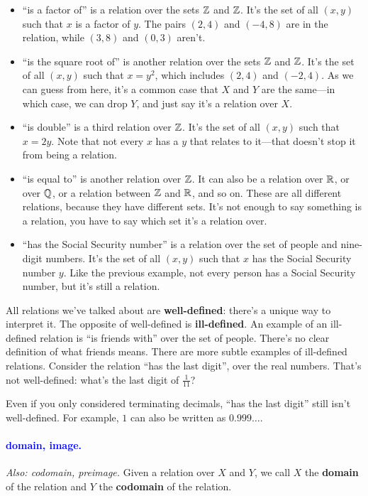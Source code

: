 \documentclass[11pt,paper=letter]{scrartcl}
\renewcommand{\bluebf}[1]{{\bfseries \color{Blue} #1}}
\renewcommand\wp[1]{\paragraph{\textcolor{Blue}{#1.}} \hspace{-1em}}
\newcommand\wl[1]{\label{w:#1}}
\newcommand\oww[1]{\textit{Also: #1.}}
\begin{document}
\begin{itemize}
  \item ``is a factor of'' is a relation over the sets $\mathbb Z$ and $\mathbb Z$. It's the set of all $(x, y)$ such that $x$ is a factor of $y$. The pairs $(2, 4)$ and $(-4, 8)$ are in the relation, while $(3, 8)$ and $(0, 3)$ aren't.
  \item ``is the square root of'' is another relation over the sets $\mathbb Z$ and $\mathbb Z$. It's the set of all $(x, y)$ such that $x = y^2$, which includes $(2, 4)$ and $(-2, 4)$. As we can guess from here, it's a common case that $X$ and $Y$ are the same---in which case, we can drop $Y$, and just say it's a relation over $X$.
  \item ``is double'' is a third relation over $\mathbb Z$. It's the set of all $(x, y)$ such that $x = 2y$. Note that not every $x$ has a $y$ that relates to it---that doesn't stop it from being a relation.
  \item ``is equal to'' is another relation over $\mathbb Z$. It can also be a relation over $\mathbb R$, or over $\mathbb Q$, or a relation between $\mathbb Z$ and $\mathbb R$, and so on. These are all different relations, because they have different sets. It's not enough to say something is a relation, you have to say which set it's a relation over.
  \item ``has the Social Security number'' is a relation over the set of people and nine-digit numbers. It's the set of all $(x, y)$ such that $x$ has the Social Security number $y$. Like the previous example, not every person has a Social Security number, but it's still a relation.
\end{itemize}

All relations we've talked about are \bluebf{well-defined}: there's a unique way to interpret it. The opposite of well-defined is \textbf{ill-defined}. An example of an ill-defined relation is ``is friends with'' over the set of people. There's no clear definition of what friends means. There are more subtle examples of ill-defined relations. Consider the relation ``has the last digit'', over the real numbers. That's not well-defined: what's the last digit of $\frac1{11}$?

\begin{remboxed}
  Even if you only considered terminating decimals, ``has the last digit'' still isn't well-defined. For example, $1$ can also be written as $0.999\dots$.
\end{remboxed}

\wp{domain, image}
\wl{domain}
\wl{image}
\oww{codomain, preimage}
Given a relation over $X$ and $Y$, we call $X$ the \bluebf{domain} of the relation and $Y$ the \textbf{codomain} of the relation.
\end{document}
